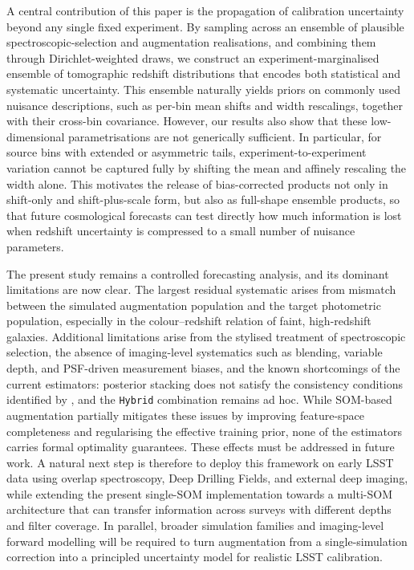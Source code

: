 A central contribution of this paper is the propagation of calibration uncertainty beyond any single fixed experiment. By sampling across an ensemble of plausible spectroscopic-selection and augmentation realisations, and combining them through Dirichlet-weighted draws, we construct an experiment-marginalised ensemble of tomographic redshift distributions that encodes both statistical and systematic uncertainty. This ensemble naturally yields priors on commonly used nuisance descriptions, such as per-bin mean shifts and width rescalings, together with their cross-bin covariance. However, our results also show that these low-dimensional parametrisations are not generically sufficient. In particular, for source bins with extended or asymmetric tails, experiment-to-experiment variation cannot be captured fully by shifting the mean and affinely rescaling the width alone. This motivates the release of bias-corrected products not only in shift-only and shift-plus-scale form, but also as full-shape ensemble products, so that future cosmological forecasts can test directly how much information is lost when redshift uncertainty is compressed to a small number of nuisance parameters.

The present study remains a controlled forecasting analysis, and its dominant limitations are now clear. The largest residual systematic arises from mismatch between the simulated augmentation population and the target photometric population, especially in the colour--redshift relation of faint, high-redshift galaxies. Additional limitations arise from the stylised treatment of spectroscopic selection, the absence of imaging-level systematics such as blending, variable depth, and PSF-driven measurement biases, and the known shortcomings of the current estimators: posterior stacking does not satisfy the consistency conditions identified by \citet{2021PhRvD.103h3502M}, and the \texttt{Hybrid} combination remains ad hoc. While SOM-based augmentation partially mitigates these issues by improving feature-space completeness and regularising the effective training prior, none of the estimators carries formal optimality guarantees. These effects must be addressed in future work. A natural next step is therefore to deploy this framework on early LSST data using overlap spectroscopy, Deep Drilling Fields, and external deep imaging, while extending the present single-SOM implementation towards a multi-SOM architecture that can transfer information across surveys with different depths and filter coverage. In parallel, broader simulation families and imaging-level forward modelling will be required to turn augmentation from a single-simulation correction into a principled uncertainty model for realistic LSST calibration.

